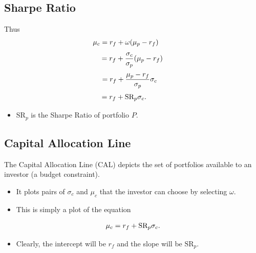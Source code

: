 \documentclass[letterpaper,10pt,english]{sphinxmanual}
\begin{document}
\subsection{Sharpe Ratio}
\label{allocation:sharpe-ratio}
Thus
\begin{gather}
\begin{split}\mu_c = r_f + \omega (\mu_p - r_f) \qquad\end{split}\notag
\end{gather}\begin{gather}
\begin{split}= r_f + \frac{\sigma_c}{\sigma_p} (\mu_p - r_f) \:\end{split}\notag
\end{gather}\begin{gather}
\begin{split}= r_f + \frac{\mu_p - r_f}{\sigma_p} \sigma_c \enspace \; \,\end{split}\notag
\end{gather}\begin{gather}
\begin{split}= r_f + \text{SR}_p \sigma_c. \qquad \enspace\end{split}\notag
\end{gather}\begin{itemize}
\item {} 
$\text{SR}_p$ is the Sharpe Ratio of portfolio $P$.

\end{itemize}


\subsection{Capital Allocation Line}
\label{allocation:capital-allocation-line}
The Capital Allocation Line (CAL) depicts the set of portfolios
available to an investor (a budget constraint).
\begin{itemize}
\item {} 
It plots pairs of $\sigma_c$ and $\mu_c$ that the
investor can choose by selecting $\omega$.

\end{itemize}
\begin{itemize}
\item {} 
This is simply a plot of the equation

\end{itemize}
\begin{gather}
\begin{split}\mu_c = r_f + \text{SR}_p \sigma_c.\end{split}\notag
\end{gather}\begin{itemize}
\item {} 
Clearly, the intercept will be $r_f$ and the slope will be
$\text{SR}_p$.

\end{itemize}
\end{document}
